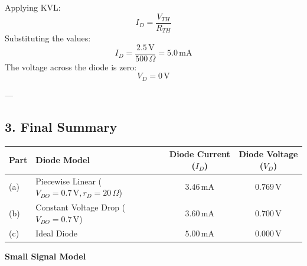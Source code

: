 \documentclass[12pt,a3paper]{article}
\newcommand{\subtopic}[2]{%
  \vspace{10pt}
  \noindent\begin{tcolorbox}[colback=#1!8,colframe=#1,boxrule=0.6pt,arc=4pt,
    left=6pt,right=6pt,top=4pt,bottom=4pt]
    \small\bfseries\textcolor{#1}{#2}
  \end{tcolorbox}
  \vspace{2pt}
}
\begin{document}
\begin{enumerate}
\begin{tcolorbox}[enhanced,breakable,ansbox,colback=cA!4,colframe=cA,boxrule=0.8pt,arc=5pt,title={\textbf{Answer}},fonttitle=\bfseries\color{white},colbacktitle=cA]
Applying KVL:
\begin{equation}
    I_D = \frac{V_{TH}}{R_{TH}}
\end{equation}
Substituting the values:
\begin{equation}
    I_D = \frac{2.5\,\text{V}}{500\,\Omega} = 5.0\,\text{mA}
\end{equation}
The voltage across the diode is zero:
\begin{equation}
    V_D = 0\,\text{V}
\end{equation}

---

\subsection*{3. Final Summary}

\begin{center}
\renewcommand{\arraystretch}{1.5}
\begin{tabular}{@{}llcc@{}}
\toprule
\textbf{Part} & \textbf{Diode Model} & \textbf{Diode Current ($I_D$)} & \textbf{Diode Voltage ($V_D$)} \\ \midrule
(a) & Piecewise Linear ($V_{DO}=0.7\,\text{V}, r_D=20\,\Omega$) & $3.46\,\text{mA}$ & $0.769\,\text{V}$ \\ 
(b) & Constant Voltage Drop ($V_{DO}=0.7\,\text{V}$) & $3.60\,\text{mA}$ & $0.700\,\text{V}$ \\ 
(c) & Ideal Diode & $5.00\,\text{mA}$ & $0.000\,\text{V}$ \\ \bottomrule
\end{tabular}
\end{center}

\end{tcolorbox}

\end{enumerate}

\subtopic{cA}{Small Signal Model}
\label{sub:s1-ssm}
\end{document}
